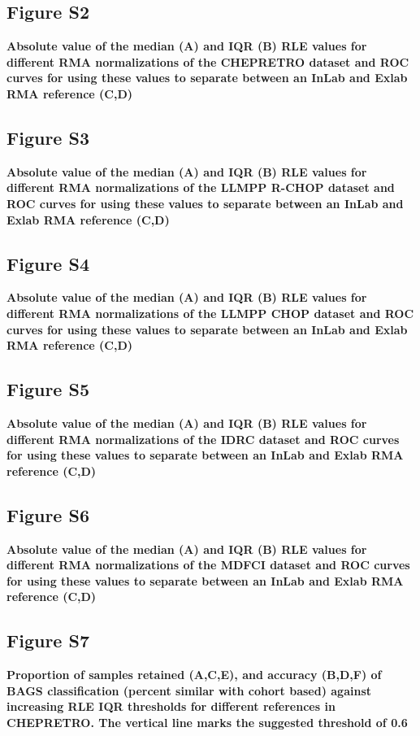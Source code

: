 \documentclass[10pt,letterpaper]{article}
\begin{document}
\subsection*{Figure S2} \label{fig:chep_rle}
{\bf Absolute value of the median (A) and IQR (B) RLE values for different RMA normalizations of the CHEPRETRO dataset and ROC curves for using these values to separate between an InLab and Exlab RMA reference (C,D)}

\subsection*{Figure S3} \label{fig:rchop_rle}
{\bf Absolute value of the median (A) and IQR (B) RLE values for different RMA normalizations of the LLMPP R-CHOP dataset and ROC curves for using these values to separate between an InLab and Exlab RMA reference (C,D)}

\subsection*{Figure S4} \label{fig:chop_rle}
{\bf Absolute value of the median (A) and IQR (B) RLE values for different RMA normalizations of the LLMPP CHOP dataset and ROC curves for using these values to separate between an InLab and Exlab RMA reference (C,D)}

\subsection*{Figure S5} \label{fig:idrc_rle}
{\bf Absolute value of the median (A) and IQR (B) RLE values for different RMA normalizations of the IDRC dataset and ROC curves for using these values to separate between an InLab and Exlab RMA reference (C,D)}

\subsection*{Figure S6} \label{fig:mdfci_rle}
{\bf Absolute value of the median (A) and IQR (B) RLE values for different RMA normalizations of the MDFCI dataset and ROC curves for using these values to separate between an InLab and Exlab RMA reference (C,D)}

\subsection*{Figure S7} \label{fig:chep_rle_clas_bags}
{\bf Proportion of samples retained (A,C,E), and accuracy (B,D,F) of BAGS classification (percent similar with cohort based) against increasing RLE IQR thresholds for different references in CHEPRETRO. The vertical line marks the suggested threshold of 0.6}
\end{document}
